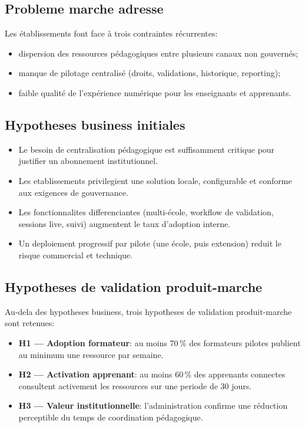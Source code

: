 \documentclass[12pt,a4paper,oneside]{report}
\begin{document}
\subsection{Probleme marche adresse}

Les établissements font face à trois contraintes récurrentes:
\begin{itemize}
  \item dispersion des ressources pédagogiques entre plusieurs canaux non gouvernés;
  \item manque de pilotage centralisé (droits, validations, historique, reporting);
  \item faible qualité de l'expérience numérique pour les enseignants et apprenants.
\end{itemize}

\subsection{Hypotheses business initiales}

\begin{itemize}
  \item Le besoin de centralisation pédagogique est suffisamment critique pour justifier un abonnement institutionnel.
  \item Les etablissements privilegient une solution locale, configurable et conforme aux exigences de gouvernance.
  \item Les fonctionnalites differenciantes (multi-école, workflow de validation, sessions live, suivi) augmentent le taux d'adoption interne.
  \item Un deploiement progressif par pilote (une école, puis extension) reduit le risque commercial et technique.
\end{itemize}

\subsection{Hypotheses de validation produit-marche}

Au-dela des hypotheses business, trois hypotheses de validation produit-marche sont retenues:
\begin{itemize}
  \item \textbf{H1 --- Adoption formateur}: au moins 70\,\% des formateurs pilotes publient au minimum une ressource par semaine.
  \item \textbf{H2 --- Activation apprenant}: au moins 60\,\% des apprenants connectes consultent activement les ressources sur une periode de 30 jours.
  \item \textbf{H3 --- Valeur institutionnelle}: l'administration confirme une réduction perceptible du temps de coordination pédagogique.
\end{itemize}
\end{document}
